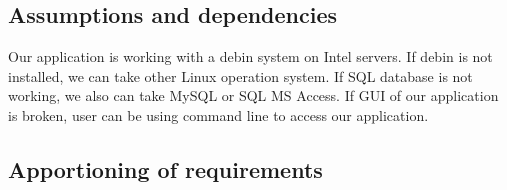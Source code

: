 \subsection{Assumptions and dependencies}

Our application is working with a debin system on Intel servers.
If debin is not installed, we can take other Linux operation system.
If SQL database is not working, we also can take MySQL or SQL MS Access.
If GUI of our application is broken, user can be using command line to access our application.

\subsection{Apportioning of requirements}
